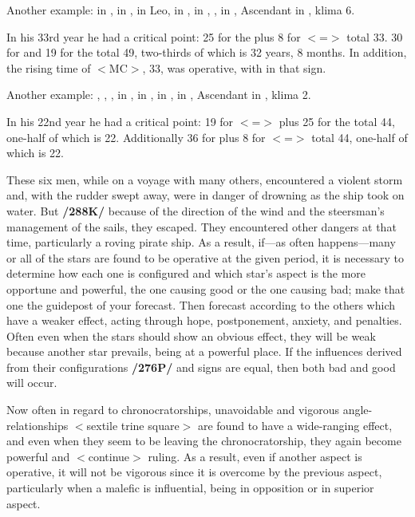 Another example: \Sun\xspace in \Aquarius, \Moon\xspace in \Aries, \Saturn\xspace in Leo, \Jupiter\xspace in \Sagittarius, \Mars\xspace in
\Libra, \Venus, \Mercury\xspace in \Capricorn, Ascendant in \Pisces, klima 6. 

In his 33rd year he had a critical point: 25 for the \Moon\xspace plus 8 for \Libra\xspace $<$=\Venus$>$ total 33. 30 for \Saturn\xspace and 19 for the \Sun\xspace total 49, two-thirds of which is 32 years, 8 months. In addition, the rising time of \Sagittarius\xspace $<$MC$>$, 33, was operative, with \Jupiter\xspace in that sign.

Another example: \Sun, \Mercury, \Venus, \Moon\xspace in \Taurus, \Saturn\xspace in \Sagittarius, \Jupiter\xspace in \Scorpio, \Mars\xspace in \Leo, Ascendant in \Pisces, klima 2. 

In his 22nd year he had a critical point: 19 for \Leo\xspace $<$=\Sun$>$ plus 25 for the \Moon\xspace total 44, one-half of which is 22. Additionally 36 for \Scorpio\xspace plus 8 for \Taurus\xspace $<$=\Venus$>$ total 44, one-half of which is 22.

These six men, while on a voyage with many others, encountered a violent storm and, with the rudder swept away, were in danger of drowning as the ship took on water. But \textbf{/288K/} because of the direction of the wind and the steersman’s management of the sails, they escaped. They encountered other dangers at that time, particularly a roving pirate ship. As a result, if—as often happens—many or all of the stars are found to be operative at the given period,
it is necessary to determine how each one is configured and which star’s aspect is the more opportune and powerful, the one causing good or the one causing bad; make that one the guidepost of your forecast. Then forecast according to the others which have a weaker effect, acting through hope, postponement, anxiety, and penalties.  Often even when the stars should show an obvious effect, they will be weak because another star prevails, being at a powerful place. If the influences derived from their configurations \textbf{/276P/} and signs
are equal, then both bad and good will occur. 

Now often in regard to chronocratorships, unavoidable and vigorous angle-relationships $<$sextile trine square$>$ are found to have a wide-ranging effect, and even when they seem to be leaving the chronocratorship, they again become powerful and $<$continue$>$ ruling. As a result, even if another aspect is operative, it will not be vigorous since it is overcome by the previous aspect, particularly when a malefic is influential, being in opposition or in superior aspect.

